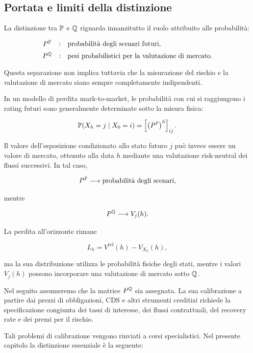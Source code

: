 \subsection{Portata e limiti della distinzione}

\label{subsec:cap9-portata-misure}

La distinzione tra $\mathbb{P}$ e $\mathbb{Q}$ riguarda innanzitutto il ruolo
attribuito alle probabilit\`{a}:

\[
\begin{array}{ccl}
P^{\mathbb{P}}
&
:
&
\text{probabilit\`{a} degli scenari futuri},
\\[2mm]
P^{\mathbb{Q}}
&
:
&
\text{pesi probabilistici per la valutazione di mercato}.
\end{array}
\]

Questa separazione non implica tuttavia che la misurazione del rischio
e la valutazione di mercato siano sempre completamente indipendenti.

In un modello di perdita mark-to-market, le probabilit\`{a} con cui si
raggiungono i rating futuri sono generalmente determinate sotto la
misura fisica:

\[
\mathbb{P}(X_h=j\mid X_0=i)
=
\left[
\left(P^{\mathbb{P}}\right)^h
\right]_{ij}.
\]

Il valore dell'esposizione condizionato allo stato futuro $j$ pu\`{o}
invece essere un valore di mercato, ottenuto alla data $h$ mediante una
valutazione risk-neutral dei flussi successivi. In tal caso,

\[
P^{\mathbb{P}}
\longrightarrow
\text{probabilit\`{a} degli scenari},
\]

mentre

\[
P^{\mathbb{Q}}
\longrightarrow
V_j(h).
\]

La perdita all'orizzonte rimane

\[
L_h
=
V^{\mathrm{ref}}(h)-V_{X_h}(h),
\]

ma la sua distribuzione utilizza le probabilit\`{a} fisiche degli
stati, mentre i valori $V_j(h)$ possono incorporare una valutazione di
mercato sotto $\mathbb{Q}$.

Nel seguito assumeremo che la matrice $P^{\mathbb{Q}}$ sia assegnata. La sua
calibrazione a partire dai prezzi di obbligazioni, CDS e altri
strumenti creditizi richiede la specificazione congiunta dei tassi di
interesse, dei flussi contrattuali, del recovery rate e dei premi per
il rischio.

Tali problemi di calibrazione vengono rinviati a corsi specialistici.
Nel presente capitolo la distinzione essenziale \`{e} la seguente:


